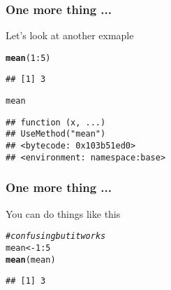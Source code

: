 \documentclass[12pt]{beamer}\usepackage[]{graphicx}\usepackage[]{color}
\makeatletter
\newcommand{\hlnum}[1]{\textcolor[rgb]{0.686,0.059,0.569}{#1}}%
\newcommand{\hlcom}[1]{\textcolor[rgb]{0.678,0.584,0.686}{\textit{#1}}}%
\newcommand{\hlopt}[1]{\textcolor[rgb]{0,0,0}{#1}}%
\newcommand{\hlstd}[1]{\textcolor[rgb]{0.345,0.345,0.345}{#1}}%
\newcommand{\hlkwb}[1]{\textcolor[rgb]{0.69,0.353,0.396}{#1}}%
\newcommand{\hlkwd}[1]{\textcolor[rgb]{0.737,0.353,0.396}{\textbf{#1}}}%
\newenvironment{kframe}{%
 \def\at@end@of@kframe{}%
 \ifinner\ifhmode%
  \def\at@end@of@kframe{\end{minipage}}%
  \begin{minipage}{\columnwidth}%
 \fi\fi%
 \def\FrameCommand##1{\hskip\@totalleftmargin \hskip-\fboxsep
 \colorbox{shadecolor}{##1}\hskip-\fboxsep
     \hskip-\linewidth \hskip-\@totalleftmargin \hskip\columnwidth}%
 \MakeFramed {\advance\hsize-\width
   \@totalleftmargin\z@ \linewidth\hsize
   \@setminipage}}%
 {\par\unskip\endMakeFramed%
 \at@end@of@kframe}
\newenvironment{knitrout}{}{} %
\makeatother
\begin{document}

\begin{frame}[fragile]
\frametitle{One more thing ...}

Let's look at another exmaple
\begin{knitrout}\footnotesize
{}\color{fgcolor}\begin{kframe}
\begin{alltt}
\hlkwd{mean}\hlstd{(}\hlnum{1}\hlopt{:}\hlnum{5}\hlstd{)}
\end{alltt}
\begin{verbatim}
## [1] 3
\end{verbatim}
\begin{alltt}
\hlstd{mean}
\end{alltt}
\begin{verbatim}
## function (x, ...) 
## UseMethod("mean")
## <bytecode: 0x103b51ed0>
## <environment: namespace:base>
\end{verbatim}
\end{kframe}
\end{knitrout}

\end{frame}


\begin{frame}[fragile]
\frametitle{One more thing ...}

You can do things like this
\begin{knitrout}\footnotesize
{}\color{fgcolor}\begin{kframe}
\begin{alltt}
\hlcom{# confusing but it works}
\hlstd{mean} \hlkwb{<-} \hlnum{1}\hlopt{:}\hlnum{5}
\hlkwd{mean}\hlstd{(mean)}
\end{alltt}
\begin{verbatim}
## [1] 3
\end{verbatim}
\end{kframe}
\end{knitrout}

\end{frame}

\end{document}

